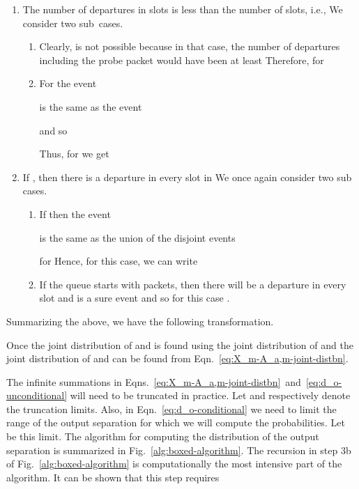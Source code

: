 \documentclass[11pt]{article}
\begin{document}
\begin{enumerate}
\item The number of departures in slots  is less than the
  number of slots, i.e.,  We consider two sub~cases.
  \begin{enumerate}
  \item Clearly,  is not possible because in that case, the
    number of departures including the probe packet  would have
    been at least  Therefore,  for 
  \item For  the event 

is the same as the event 

and so 

    Thus, for  we get
     
\end{enumerate}

\item If , then there is a departure in every slot in 
  We once again consider two sub cases.
  \begin{enumerate}
  \item If  then the event 
    
    is the same as the union of the disjoint events 
    
    for  Hence, for this case, we can write
    

  \item If the queue starts with  packets, then
    there will be a departure in every slot and  is a
    sure event and so for this case .
  \end{enumerate} 
\end{enumerate}
Summarizing the above, we have the following transformation.



Once the joint distribution of  and  is found
using the joint distribution of  and  the joint
distribution of  and  can be found from
Eqn.~\ref{eq:X_m-A_a,m-joint-distbn}.

The infinite summations in
Eqns.~\ref{eq:X_m-A_a,m-joint-distbn}~and~\ref{eq:d_o-unconditional}
will need to be truncated in practice. Let  and 
respectively denote the truncation limits. Also, in
Eqn.~\ref{eq:d_o-conditional} we need to limit the range of the output
separation for which we will compute the probabilities. Let  be
this limit. The algorithm for computing the distribution of the output
separation is summarized in Fig.~\ref{alg:boxed-algorithm}.  The
recursion in step 3b of Fig.~\ref{alg:boxed-algorithm} is
computationally the most intensive part of the algorithm. It can be
shown that this step requires
\end{document}
